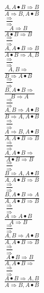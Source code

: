\documentclass[11pt]{article}
\begin{document}
\begin{center}
\bigskip
\\$\frac{A, A\bullet B\Rightarrow B}{A\Rightarrow B, A\bullet B}$
\bigskip
\\$\frac{\Rightarrow }{\Rightarrow }$
\bigskip
\\$\frac{A\Rightarrow B}{A\bullet B\Rightarrow B}$
\bigskip
\\$\frac{\Rightarrow }{\Rightarrow }$
\bigskip
\\$\frac{A, A\bullet B\Rightarrow B}{A\bullet B\Rightarrow A, B}$
\bigskip
\\$\frac{\Rightarrow }{\Rightarrow }$
\bigskip
\\$\frac{A, B\Rightarrow }{B\Rightarrow A\bullet B}$
\bigskip
\\$\frac{\Rightarrow }{\Rightarrow }$
\bigskip
\\$\frac{B, A\bullet B\Rightarrow }{B\Rightarrow A}$
\bigskip
\\$\frac{\Rightarrow }{\Rightarrow }$
\bigskip
\\$\frac{A, B\Rightarrow A\bullet B}{B\Rightarrow A, A\bullet B}$
\bigskip
\\$\frac{\Rightarrow }{\Rightarrow }$
\bigskip
\\$\frac{A\Rightarrow B, A\bullet B}{A, A\bullet B\Rightarrow B}$
\bigskip
\\$\frac{\Rightarrow }{\Rightarrow }$
\bigskip
\\$\frac{A, A\bullet B\Rightarrow }{A\bullet B\Rightarrow B}$
\bigskip
\\$\frac{\Rightarrow }{\Rightarrow }$
\bigskip
\\$\frac{B\Rightarrow A, A\bullet B}{A, A\bullet B\Rightarrow B}$
\bigskip
\\$\frac{\Rightarrow }{\Rightarrow }$
\bigskip
\\$\frac{B, A\bullet B\Rightarrow A}{A, A\bullet B\Rightarrow B}$
\bigskip
\\$\frac{\Rightarrow }{\Rightarrow }$
\bigskip
\\$\frac{A\Rightarrow A\bullet B}{A\Rightarrow B}$
\bigskip
\\$\frac{\Rightarrow }{\Rightarrow }$
\bigskip
\\$\frac{A, B\Rightarrow A\bullet B}{A, A\bullet B\Rightarrow B}$
\bigskip
\\$\frac{\Rightarrow }{\Rightarrow }$
\bigskip
\\$\frac{A\bullet B\Rightarrow B}{A, A\bullet B\Rightarrow }$
\bigskip
\\$\frac{\Rightarrow }{\Rightarrow }$
\bigskip
\\$\frac{A\bullet B\Rightarrow A, B}{A\Rightarrow B, A\bullet B}$

\end{center}
\end{document}
